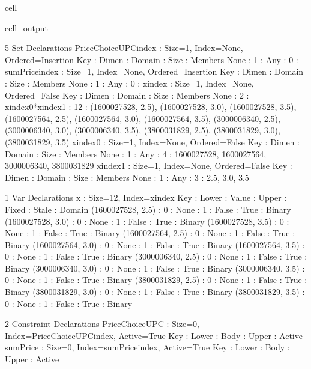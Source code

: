 \documentclass[letterpaper,10pt,english]{jupyterBook}
\begin{document}
\begin{sphinxuseclass}{cell}
\begin{sphinxVerbatimOutput}
\begin{sphinxuseclass}{cell_output}
\begin{sphinxVerbatim}[commandchars=\\\{\}]
5 Set Declarations
    PriceChoiceUPC\PYGZus{}index : Size=1, Index=None, Ordered=Insertion
        Key  : Dimen : Domain : Size : Members
        None :     1 :    Any :    0 :      \PYGZob{}\PYGZcb{}
    sumPrice\PYGZus{}index : Size=1, Index=None, Ordered=Insertion
        Key  : Dimen : Domain : Size : Members
        None :     1 :    Any :    0 :      \PYGZob{}\PYGZcb{}
    x\PYGZus{}index : Size=1, Index=None, Ordered=False
        Key  : Dimen : Domain              : Size : Members
        None :     2 : x\PYGZus{}index\PYGZus{}0*x\PYGZus{}index\PYGZus{}1 :   12 : \PYGZob{}(1600027528, 2.5), (1600027528, 3.0), (1600027528, 3.5), (1600027564, 2.5), (1600027564, 3.0), (1600027564, 3.5), (3000006340, 2.5), (3000006340, 3.0), (3000006340, 3.5), (3800031829, 2.5), (3800031829, 3.0), (3800031829, 3.5)\PYGZcb{}
    x\PYGZus{}index\PYGZus{}0 : Size=1, Index=None, Ordered=False
        Key  : Dimen : Domain : Size : Members
        None :     1 :    Any :    4 : \PYGZob{}1600027528, 1600027564, 3000006340, 3800031829\PYGZcb{}
    x\PYGZus{}index\PYGZus{}1 : Size=1, Index=None, Ordered=False
        Key  : Dimen : Domain : Size : Members
        None :     1 :    Any :    3 : \PYGZob{}2.5, 3.0, 3.5\PYGZcb{}

1 Var Declarations
    x : Size=12, Index=x\PYGZus{}index
        Key               : Lower : Value : Upper : Fixed : Stale : Domain
        (1600027528, 2.5) :     0 :  None :     1 : False :  True : Binary
        (1600027528, 3.0) :     0 :  None :     1 : False :  True : Binary
        (1600027528, 3.5) :     0 :  None :     1 : False :  True : Binary
        (1600027564, 2.5) :     0 :  None :     1 : False :  True : Binary
        (1600027564, 3.0) :     0 :  None :     1 : False :  True : Binary
        (1600027564, 3.5) :     0 :  None :     1 : False :  True : Binary
        (3000006340, 2.5) :     0 :  None :     1 : False :  True : Binary
        (3000006340, 3.0) :     0 :  None :     1 : False :  True : Binary
        (3000006340, 3.5) :     0 :  None :     1 : False :  True : Binary
        (3800031829, 2.5) :     0 :  None :     1 : False :  True : Binary
        (3800031829, 3.0) :     0 :  None :     1 : False :  True : Binary
        (3800031829, 3.5) :     0 :  None :     1 : False :  True : Binary

2 Constraint Declarations
    PriceChoiceUPC : Size=0, Index=PriceChoiceUPC\PYGZus{}index, Active=True
        Key : Lower : Body : Upper : Active
    sumPrice : Size=0, Index=sumPrice\PYGZus{}index, Active=True
        Key : Lower : Body : Upper : Active


\end{sphinxVerbatim}
\end{sphinxuseclass}
\end{sphinxVerbatimOutput}
\end{sphinxuseclass}
\end{document}
